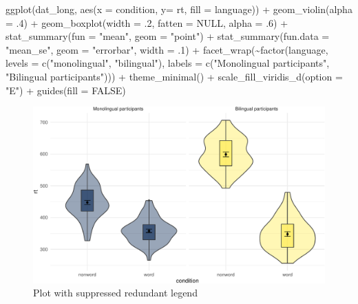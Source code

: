 \documentclass[
  english,
  doc,floatsintext]{apa6}
\newenvironment{Shaded}{\begin{snugshade}}{\end{snugshade}}
\newcommand{\AttributeTok}[1]{\textcolor[rgb]{0.77,0.63,0.00}{#1}}
\newcommand{\ConstantTok}[1]{\textcolor[rgb]{0.00,0.00,0.00}{#1}}
\newcommand{\DecValTok}[1]{\textcolor[rgb]{0.00,0.00,0.81}{#1}}
\newcommand{\FunctionTok}[1]{\textcolor[rgb]{0.00,0.00,0.00}{#1}}
\newcommand{\NormalTok}[1]{#1}
\newcommand{\SpecialCharTok}[1]{\textcolor[rgb]{0.00,0.00,0.00}{#1}}
\newcommand{\StringTok}[1]{\textcolor[rgb]{0.31,0.60,0.02}{#1}}
\begin{document}
\begin{Shaded}
\begin{Highlighting}[]
\FunctionTok{ggplot}\NormalTok{(dat\_long, }\FunctionTok{aes}\NormalTok{(}\AttributeTok{x =}\NormalTok{ condition, }\AttributeTok{y=}\NormalTok{ rt, }\AttributeTok{fill =}\NormalTok{ language)) }\SpecialCharTok{+}
  \FunctionTok{geom\_violin}\NormalTok{(}\AttributeTok{alpha =}\NormalTok{ .}\DecValTok{4}\NormalTok{) }\SpecialCharTok{+}
  \FunctionTok{geom\_boxplot}\NormalTok{(}\AttributeTok{width =}\NormalTok{ .}\DecValTok{2}\NormalTok{, }\AttributeTok{fatten =} \ConstantTok{NULL}\NormalTok{, }\AttributeTok{alpha =}\NormalTok{ .}\DecValTok{6}\NormalTok{) }\SpecialCharTok{+}
  \FunctionTok{stat\_summary}\NormalTok{(}\AttributeTok{fun =} \StringTok{"mean"}\NormalTok{, }\AttributeTok{geom =} \StringTok{"point"}\NormalTok{) }\SpecialCharTok{+}
  \FunctionTok{stat\_summary}\NormalTok{(}\AttributeTok{fun.data =} \StringTok{"mean\_se"}\NormalTok{, }\AttributeTok{geom =} \StringTok{"errorbar"}\NormalTok{, }\AttributeTok{width =}\NormalTok{ .}\DecValTok{1}\NormalTok{) }\SpecialCharTok{+}
  \FunctionTok{facet\_wrap}\NormalTok{(}\SpecialCharTok{\textasciitilde{}}\FunctionTok{factor}\NormalTok{(language, }
                     \AttributeTok{levels =} \FunctionTok{c}\NormalTok{(}\StringTok{"monolingual"}\NormalTok{, }\StringTok{"bilingual"}\NormalTok{),}
                     \AttributeTok{labels =} \FunctionTok{c}\NormalTok{(}\StringTok{"Monolingual participants"}\NormalTok{, }
                                \StringTok{"Bilingual participants"}\NormalTok{))) }\SpecialCharTok{+}
  \FunctionTok{theme\_minimal}\NormalTok{() }\SpecialCharTok{+}
  \FunctionTok{scale\_fill\_viridis\_d}\NormalTok{(}\AttributeTok{option =} \StringTok{"E"}\NormalTok{) }\SpecialCharTok{+}
  \FunctionTok{guides}\NormalTok{(}\AttributeTok{fill =} \ConstantTok{FALSE}\NormalTok{)}
\end{Highlighting}
\end{Shaded}

\begin{figure}

{\centering \includegraphics[width=1\linewidth]{images/legend-suppress-1} 

}

\caption{Plot with suppressed redundant legend}\label{fig:legend-suppress}
\end{figure}
\end{document}

